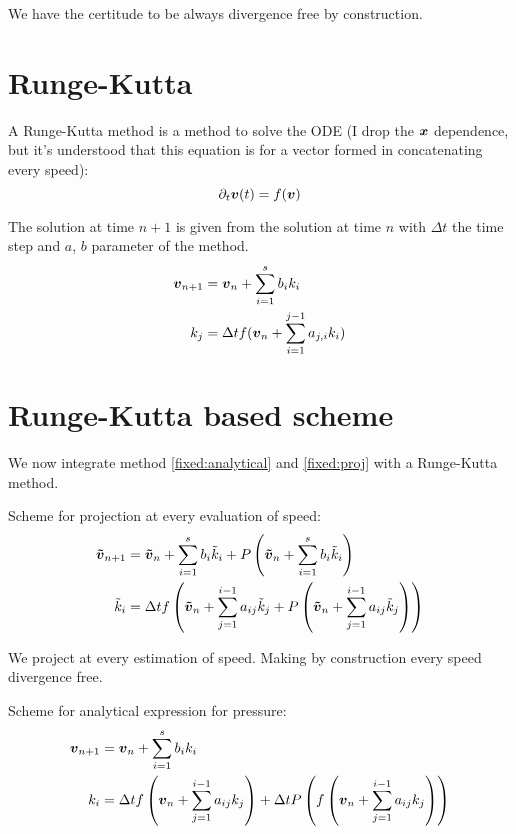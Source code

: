 We have the certitude to be always divergence free by construction.

\section{Runge-Kutta}

A Runge-Kutta method is a method to solve the ODE (I drop the ${\boldsymbol {x}}$ dependence, but it's understood that this equation is for a vector formed in concatenating every speed):
\begin{equation}
\partial_t {\boldsymbol {v}}(t)=f({\boldsymbol {v}})
\end{equation}

The solution at time $n+1$ is given from the solution at time $n$ with $\Delta t$ the time step and $a$, $b$ parameter of the method.
\begin{subequations}
\begin{align}
	{\boldsymbol {v}}_{n+1}&={\boldsymbol {v}}_{n}+\sum_{i=1}^{s}b_{i}k_{i}\\
	k_{j}&=\Delta t f({\boldsymbol {v}}_{n}+\sum_{i=1}^{j-1}a_{j,i}k_{i})
\end{align}
\end{subequations}

\section{Runge-Kutta based scheme}

We now integrate method \ref{fixed:analytical} and \ref{fixed:proj} with a Runge-Kutta method.

Scheme for projection at every evaluation of speed:
\begin{subequations}
\begin{align}
{\boldsymbol {\tilde{v}}}_{n+1}&={\boldsymbol {\tilde{v}}}_{n}+\sum_{i=1}^{s}b_{i}\tilde{k}_{i}+P\left({\boldsymbol {\tilde{v}}}_{n}+\sum_{i=1}^{s}b_{i}\tilde{k}_{i}\right)\\
\tilde{k}_{i}&=\Delta t f\left({\boldsymbol {\tilde{v}}}_{n}+\sum_{j=1}^{i-1}a_{ij}\tilde{k}_{j}+P\left({\boldsymbol {\tilde{v}}}_{n}+\sum_{j=1}^{i-1}a_{ij}\tilde{k}_{j}\right)\right)
\end{align}
\end{subequations}

We project at every estimation of speed. Making by construction every speed divergence free.

Scheme for analytical expression for pressure:
\begin{subequations}
\begin{align}
	{\boldsymbol {v}}_{n+1}&={\boldsymbol {v}}_{n}+\sum_{i=1}^{s}b_{i}k_{i}\\
	k_{i}&=\Delta t f\left({\boldsymbol {v}}_{n}+\sum_{j=1}^{i-1}a_{ij}k_{j}\right)+\Delta t P\left(f\left({\boldsymbol {v}}_{n}+\sum_{j=1}^{i-1}a_{ij}k_{j}\right)\right)
\end{align}
\end{subequations}

